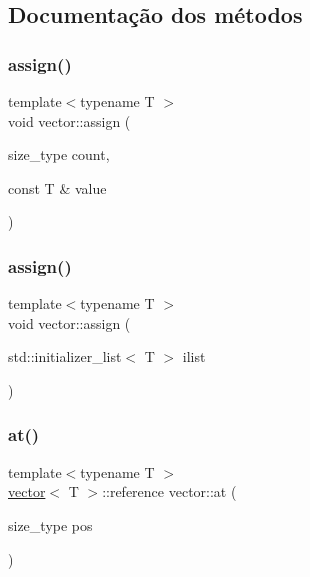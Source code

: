 \subsection{Documentação dos métodos}
\mbox{\label{classsc_1_1vector_af5f4df8bef0f4ebd20bb4c5aab212d97}} 
\subsubsection{\texorpdfstring{assign()}{assign()}\hspace{0.1cm}{\footnotesize\ttfamily [1/2]}}
{\footnotesize\ttfamily template$<$typename T $>$ \\
void vector\+::assign (\begin{DoxyParamCaption}\item[{size\+\_\+type}]{count,  }\item[{const T \&}]{value }\end{DoxyParamCaption})}

\mbox{\label{classsc_1_1vector_a0cdd83f25897cf689a6805f94df13b2f}} 
\subsubsection{\texorpdfstring{assign()}{assign()}\hspace{0.1cm}{\footnotesize\ttfamily [2/2]}}
{\footnotesize\ttfamily template$<$typename T $>$ \\
void vector\+::assign (\begin{DoxyParamCaption}\item[{std\+::initializer\+\_\+list$<$ T $>$}]{ilist }\end{DoxyParamCaption})}

\mbox{\label{classsc_1_1vector_ade22050951b0a2b13211efd3ba57e7f2}} 
\subsubsection{\texorpdfstring{at()}{at()}}
{\footnotesize\ttfamily template$<$typename T $>$ \\
\mbox{\hyperlink{classsc_1_1vector}{vector}}$<$ T $>$\+::reference vector\+::at (\begin{DoxyParamCaption}\item[{size\+\_\+type}]{pos }\end{DoxyParamCaption})}

